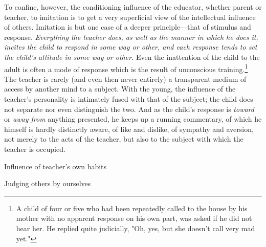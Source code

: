 \documentclass[letterpaper]{book}
\begin{document}
To confine, however, the conditioning influence of the educator, whether
parent or teacher, to imitation is to get a very superficial view of the
intellectual influence of others. Imitation is but one case of a deeper
principle---that of stimulus and response. \emph{Everything the teacher
does, as well as the manner in which he does it, incites the child to
respond in some way or other, and each response tends to set the child's
attitude in some way or other.} Even the inattention of the child to the
adult is often a mode of response which is the result of unconscious
training.\footnote{
A child of four or five who had been repeatedly called to the house by
his mother with no apparent response on his own part, was asked if he
did not hear her. He replied quite judicially, "Oh, yes, but she doesn't
call very mad yet."
}
The teacher is rarely (and even then never entirely) a transparent
medium of access by another mind to a subject. With the young, the
influence of the teacher's personality is intimately fused with that of
the subject; the child does not
separate
nor even distinguish the two. And as the child's response is
\emph{toward} or \emph{away from} anything presented, he keeps up a
running commentary, of which he himself is hardly distinctly aware, of
like and dislike, of sympathy and aversion, not merely to the acts of
the teacher, but also to the subject with which the teacher is occupied.

Influence of teacher's own habits

Judging others by ourselves
\end{document}
